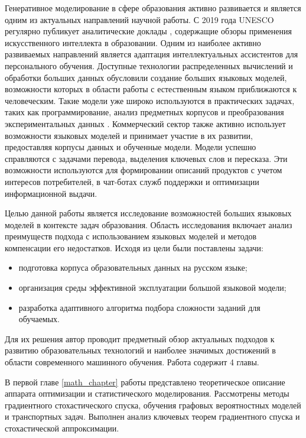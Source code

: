 Генеративное моделирование в сфере образования активно развивается и является одним из актуальных направлений научной работы. 
С 2019 года UNESCO регулярно публикует аналитические доклады \cite{unesco2019beijing}\cite{annuvs2024education},
содержащие обзоры применения искусственного интеллекта в образовании. Одним из наиболее активно развиваемых направлений является адаптация
интеллектуальных ассистентов для персонального обучения. Доступные технологии распределенных вычислений и обработки больших данных обусловили 
создание больших языковых моделей, возможности которых в области работы с естественным языком приближаются к человеческим. Такие модели уже
широко используются в практических задачах, таких как программирование, анализ предметных корпусов и преобразования экспериментальных данных \cite{llamatouvron2023}. 
Коммерческий сектор также активно использует возможности языковых моделей и принимает участие в их развитии, предоставляя корпусы данных и обученные модели.
Модели успешно справляются с задачами перевода, выделения ключевых слов и пересказа. Эти возможности используются для формировании описаний продуктов с 
учетом интересов потребителей, в чат-ботах служб поддержки и оптимизации информационной выдачи.

Целью данной работы является исследование возможностей больших языковых моделей в контексте задач образования. Область исследования
включает анализ преимуществ подхода с использованием языковых моделей и методов компенсации его недостатков. Исходя из цели были поставлены задачи:
\begin{itemize}
    \item подготовка корпуса образовательных данных на русском языке;
    \item организация среды эффективной эксплуатации большой языковой модели;
    \item разработка адаптивного алгоритма подбора сложности заданий для обучаемых.
\end{itemize}

Для их решения автор проводит предметный обзор актуальных подходов к развитию образовательных технологий и
наиболее значимых достижений в области современного машинного обучения. Работа содержит 4 главы.

В первой главе \ref{math_chapter} работы представлено теоретическое описание аппарата оптимизации и статистического моделирования. 
Рассмотрены методы градиентного стохастического спуска, обучения графовых вероятностных моделей и транспортных задач. 
Выполнен анализ ключевых теорем градиентного спуска и стохастической аппроксимации. 

